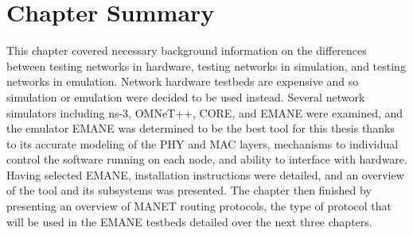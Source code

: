 \section{Chapter Summary}
This chapter covered necessary background information on the differences between testing networks in hardware, testing networks in simulation, and testing networks in emulation.
Network hardware testbeds are expensive and so simulation or emulation were decided to be used instead.
Several network simulators including ns-3, OMNeT++, CORE, and EMANE were examined, and the emulator EMANE was determined to be the best tool for this thesis thanks to its accurate modeling of the PHY and MAC layers, mechanisms to individual control the software running on each node, and ability to interface with hardware.
Having selected EMANE, installation instructions were detailed, and an overview of the tool and its subsystems was presented.
The chapter then finished by presenting an overview of MANET routing protocols, the type of protocol that will be used in the EMANE testbeds detailed over the next three chapters.